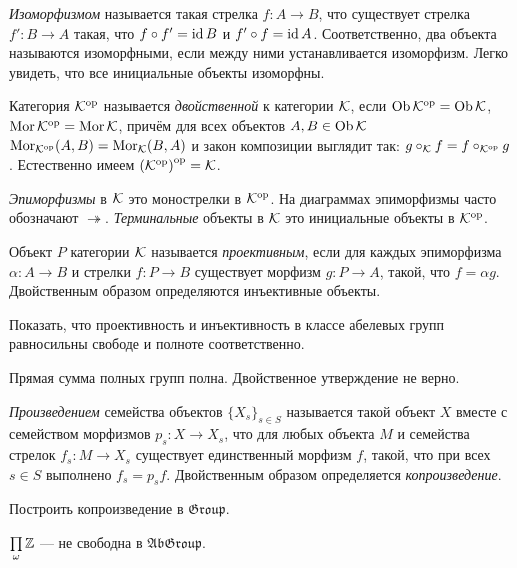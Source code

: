 \documentclass[10pt,a4paper]{article}%
\begin{document}
{\em Изоморфизмом} называется такая стрелка
$f:A\to B$, что существует стрелка $f':B\to A$ такая, что $f\circ
f'=\operatorname{id} B$ и $f'\circ f=\operatorname{id} A$. Соответственно, два объекта
называются изоморфными, если между ними устанавливается
изоморфизм. Легко увидеть, что все инициальные объекты изоморфны.

Категория ${\mathcal{K}}^{\mathrm{op}}$ называется {\em
двойственной} к категории $\mathcal{K}$,
если $\operatorname{Ob}{\mathcal{K}}^{\mathrm{op}}=\operatorname{Ob}\mathcal{K}$, $\operatorname{Mor}{\mathcal{K}}^{\mathrm{op}}=\operatorname{Mor}\mathcal{K}$, причём для всех
объектов $A,B\in\operatorname{Ob}\mathcal{K}$ $\operatorname{Mor}_{{\mathcal{K}}^{\mathrm{op}}}(A,B)=\operatorname{Mor}_{\mathcal{K}}(B,A)$ и
закон композиции выглядит так: $g\circ_{\mathcal{K}}f=f\circ_{{\mathcal{K}}^{\mathrm{op}}}g$.
Естественно имеем ${({\mathcal{K}}^{\mathrm{op}})}^{\mathrm{op}}=\mathcal{K}$.

{\em Эпиморфизмы} в $\mathcal{K}$ это монострелки в
${\mathcal{K}}^{\mathrm{op}}$. На диаграммах эпиморфизмы часто обозначают
$\twoheadrightarrow$. {\em
Терминальные} объекты в $\mathcal{K}$ это
инициальные объекты в ${\mathcal{K}}^{\mathrm{op}}$.

Объект $P$ категории $\mathcal{K}$ называется {\em
проективным}, если для каждых
эпиморфизма $\alpha:A\to B$ и стрелки $f:P\to B$ существует
морфизм $g:P\to A$, такой, что $f=\alpha g$. Двойственным образом
определяются инъективные объекты.

\begin{exercise} Показать, что проективность и инъективность в классе
абелевых групп равносильны свободе и полноте соответственно.
\end{exercise}

Прямая сумма полных групп полна. Двойственное утверждение не
верно.

\vskip-12pt  \hangindent=-30mm 
{\em Произведением} семейства
объектов $\{X_s\}_{s\in S}$ называется такой объект $X$ вместе с
семейством морфизмов $p_s:X\to X_s$, что для любых объекта $M$ и
семейства стрелок $f_s:M\to X_s$ существует единственный морфизм
$f$, такой, что при всех $s\in S$ выполнено $f_s=p_sf$.
Двойственным образом определяется {\em
копроизведение}.

\begin{exercise}
Построить копроизведение в $\mathfrak{Group}$.
\end{exercise}

\begin{exercise} $\prod\limits_\omega \mathbb Z$ --- не свободна в
$\mathfrak{AbGroup}$.
\end{exercise}
\end{document}
